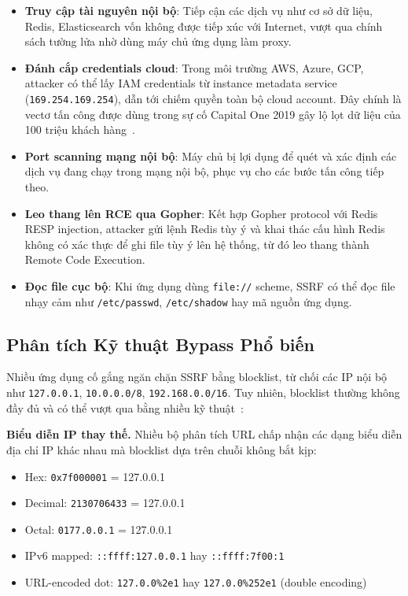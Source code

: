 \begin{itemize}
    \item \textbf{Truy cập tài nguyên nội bộ}: Tiếp cận các dịch vụ như cơ
    sở dữ liệu, Redis, Elasticsearch vốn không được tiếp xúc với Internet,
    vượt qua chính sách tường lửa nhờ dùng máy chủ ứng dụng làm proxy.
    \item \textbf{Đánh cắp credentials cloud}: Trong môi trường AWS, Azure,
    GCP, attacker có thể lấy IAM credentials từ instance metadata service
    (\texttt{169.254.169.254}), dẫn tới chiếm quyền toàn bộ cloud account.
    Đây chính là vectơ tấn công được dùng trong sự cố Capital One 2019 gây
    lộ lọt dữ liệu của 100 triệu khách hàng~\cite{owasp2021top10}.
    \item \textbf{Port scanning mạng nội bộ}: Máy chủ bị lợi dụng để quét
    và xác định các dịch vụ đang chạy trong mạng nội bộ, phục vụ cho các
    bước tấn công tiếp theo.
    \item \textbf{Leo thang lên RCE qua Gopher}: Kết hợp Gopher protocol với
    Redis RESP injection, attacker gửi lệnh Redis tùy ý và khai thác cấu hình
    Redis không có xác thực để ghi file tùy ý lên hệ thống, từ đó leo thang
    thành Remote Code Execution.
    \item \textbf{Đọc file cục bộ}: Khi ứng dụng dùng \texttt{file://} scheme,
    SSRF có thể đọc file nhạy cảm như \texttt{/etc/passwd},
    \texttt{/etc/shadow} hay mã nguồn ứng dụng.
\end{itemize}

\subsection{Phân tích Kỹ thuật Bypass Phổ biến}
\label{subsec:ssrf-bypass}

Nhiều ứng dụng cố gắng ngăn chặn SSRF bằng blocklist, từ chối các IP nội
bộ như \texttt{127.0.0.1}, \texttt{10.0.0.0/8}, \texttt{192.168.0.0/16}.
Tuy nhiên, blocklist thường không đầy đủ và có thể vượt qua bằng nhiều
kỹ thuật~\cite{owasp2023ssrf}:

\textbf{Biểu diễn IP thay thế.} Nhiều bộ phân tích URL chấp nhận các dạng
biểu diễn địa chỉ IP khác nhau mà blocklist dựa trên chuỗi không bắt kịp:
\begin{itemize}
    \item Hex: \texttt{0x7f000001} = 127.0.0.1
    \item Decimal: \texttt{2130706433} = 127.0.0.1
    \item Octal: \texttt{0177.0.0.1} = 127.0.0.1
    \item IPv6 mapped: \texttt{::ffff:127.0.0.1} hay \texttt{::ffff:7f00:1}
    \item URL-encoded dot: \texttt{127.0.0\%2e1} hay \texttt{127.0.0\%252e1}
    (double encoding)
\end{itemize}

